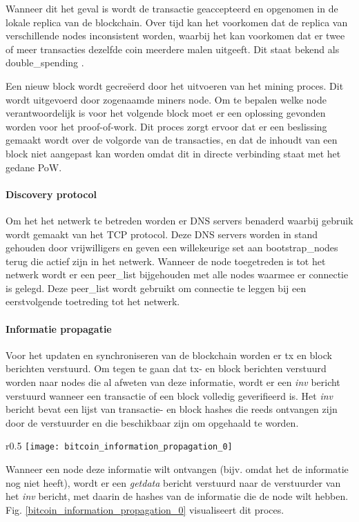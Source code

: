 Wanneer dit het geval is wordt de transactie geaccepteerd en opgenomen in de lokale replica van de blockchain. Over tijd kan het voorkomen dat de replica van verschillende \glspl{node} inconsistent worden, waarbij het kan voorkomen dat er twee of meer transacties dezelfde coin meerdere malen uitgeeft. Dit staat bekend als \gls{double_spending} \citep{6688704}.

\clearpage
Een nieuw block wordt gecreëerd door het uitvoeren van het mining proces. Dit wordt uitgevoerd door zogenaamde \glspl{miner} node. Om te bepalen welke \gls{node} verantwoordelijk is voor het volgende block moet er een oplossing gevonden worden voor het proof-of-work. Dit proces zorgt ervoor dat er een beslissing gemaakt wordt over de volgorde van de transacties, en dat de inhoudt van een block niet aangepast kan worden omdat dit in directe verbinding staat met het gedane \acrshort{PoW}.

\paragraph{Discovery protocol}

Om het het netwerk te betreden worden er DNS servers benaderd waarbij gebruik wordt gemaakt van het TCP protocol. Deze DNS servers worden in stand gehouden door vrijwilligers en geven een willekeurige set aan \glspl{bootstrap_node} terug die actief zijn in het netwerk. Wanneer de \gls{node} toegetreden is tot het netwerk wordt er een \gls{peer_list} bijgehouden met alle \glspl{node} waarmee er connectie is gelegd. Deze \gls{peer_list} wordt gebruikt om connectie te leggen bij een eerstvolgende toetreding tot het netwerk.

\paragraph{Informatie propagatie}

Voor het updaten en synchroniseren van de blockchain worden er \acrfull{tx} en block berichten verstuurd. Om tegen te gaan dat \acrshort{tx}- en block berichten verstuurd worden naar \glspl{node} die al afweten van deze informatie, wordt er een \textit{inv} bericht verstuurd wanneer een transactie of een block volledig geverifieerd is. Het \textit{inv} bericht bevat een lijst van transactie- en block hashes die reeds ontvangen zijn door de verstuurder en die beschikbaar zijn om opgehaald te worden. 
\begin{wrapfigure}{r}{0.5\textwidth}
  \texttt{[image: bitcoin\_information\_propagation\_0]}
  \caption[Communicatie tussen deelnemers in Bitcoin]{Berichten die verzonden worden om informatie over een block uit te wisselen \citep[p.~4]{6688704}.}
  \label{bitcoin_information_propagation_0}
\end{wrapfigure}

Wanneer een \gls{node} deze informatie wilt ontvangen (bijv. omdat het de informatie nog niet heeft), wordt er een \textit{getdata} bericht verstuurd naar de verstuurder van het \textit{inv} bericht, met daarin de hashes van de informatie die de \gls{node} wilt hebben. Fig. \ref{bitcoin_information_propagation_0} visualiseert dit proces.